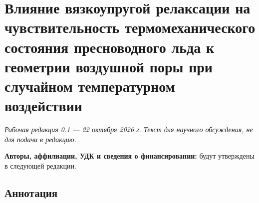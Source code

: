 \documentclass[
]{article}
\author{}
\date{}
\begin{document}
\section{Влияние вязкоупругой релаксации на чувствительность
термомеханического состояния пресноводного льда к геометрии воздушной
поры при случайном температурном
воздействии}\label{ux432ux43bux438ux44fux43dux438ux435-ux432ux44fux437ux43aux43eux443ux43fux440ux443ux433ux43eux439-ux440ux435ux43bux430ux43aux441ux430ux446ux438ux438-ux43dux430-ux447ux443ux432ux441ux442ux432ux438ux442ux435ux43bux44cux43dux43eux441ux442ux44c-ux442ux435ux440ux43cux43eux43cux435ux445ux430ux43dux438ux447ux435ux441ux43aux43eux433ux43e-ux441ux43eux441ux442ux43eux44fux43dux438ux44f-ux43fux440ux435ux441ux43dux43eux432ux43eux434ux43dux43eux433ux43e-ux43bux44cux434ux430-ux43a-ux433ux435ux43eux43cux435ux442ux440ux438ux438-ux432ux43eux437ux434ux443ux448ux43dux43eux439-ux43fux43eux440ux44b-ux43fux440ux438-ux441ux43bux443ux447ux430ux439ux43dux43eux43c-ux442ux435ux43cux43fux435ux440ux430ux442ux443ux440ux43dux43eux43c-ux432ux43eux437ux434ux435ux439ux441ux442ux432ux438ux438}

\emph{Рабочая редакция 0.1 --- 22 октября 2026 г. Текст для научного
обсуждения, не для подачи в редакцию.}

\textbf{Авторы, аффилиации, УДК и сведения о финансировании:} будут
утверждены в следующей редакции.

\subsection{Аннотация}\label{ux430ux43dux43dux43eux442ux430ux446ux438ux44f}
\end{document}
